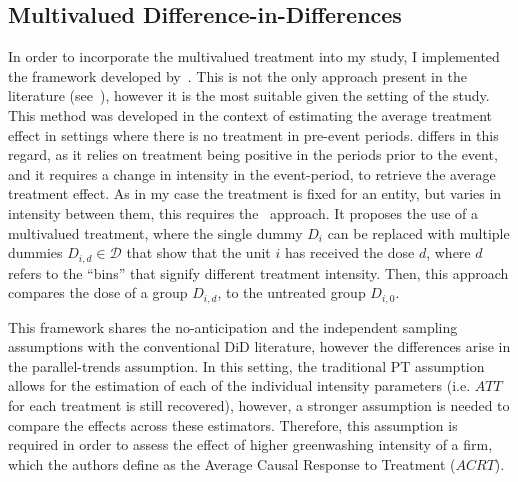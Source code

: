 \documentclass[12pt]{article}
\begin{document}
\subsection{Multivalued Difference-in-Differences}

In order to incorporate the multivalued treatment into my study, I implemented the framework developed by~\textcite{callawayDifferenceinDifferencesContinuousTreatment2025}. This is not the only approach present in the literature (see~\cite{dechaisemartinDifferenceinDifferenceEstimatorsContinuous2024}), however it is the most suitable given the setting of the study. This method was developed in the context of estimating the average treatment effect in settings where there is no treatment in pre-event periods.\@ \citeauthor{dechaisemartinDifferenceinDifferenceEstimatorsContinuous2024} differs in this regard, as it relies on treatment being positive in the periods prior to the event, and it requires a change in intensity in the event-period, to retrieve the average treatment effect. As in my case the treatment is fixed for an entity, but varies in intensity between them, this requires the~\textcite{callawayDifferenceinDifferencesContinuousTreatment2025} approach. It proposes the use of a multivalued treatment, where the single dummy $D_i$ can be replaced with multiple dummies $D_{i,d} \in \mathcal{D}$ that show that the unit $i$ has received the dose $d$, where $d$ refers to the ``bins'' that signify different treatment intensity. Then, this approach compares the dose of a group $D_{i,d}$, to the untreated group $D_{i,0}$.

This framework shares the no-anticipation and the independent sampling assumptions with the conventional DiD literature, however the differences arise in the parallel-trends assumption. In this setting, the traditional PT assumption allows for the estimation of each of the individual intensity parameters (i.e. $ATT$ for each treatment is still recovered), however, a stronger assumption is needed to compare the effects across these estimators. Therefore, this assumption is required in order to assess the effect of higher greenwashing intensity of a firm, which the authors define as the Average Causal Response to Treatment ($ACRT$).  
\end{document}
